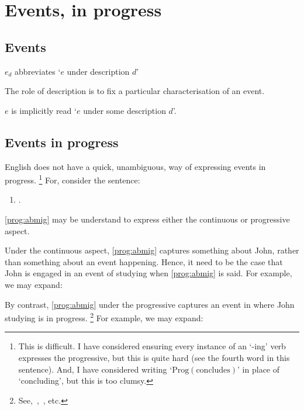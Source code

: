 \chapter{Events, in progress}
\label{cha:events-progress}


\section{Events}
\label{sec:events}


\begin{note}
  \(e_{d}\) abbreviates `\(e\) under description \(d\)'

  The role of description is to fix a particular characterisation of an event.

  \(e\) is implicitly read `\(e\) under some description \(d\)'.
\end{note}



\section{Events in progress}
\label{sec:events-progress}

\begin{note}
    \noindent%
  English does not have a quick, unambiguous, way of expressing events in progress.%
  \footnote{
    This is difficult.
    I have considered ensuring every instance of an `-ing' verb expresses the progressive, but this is quite hard (see the fourth word in this sentence).
    And, I have considered writing `\(\text{Prog}(\text{concludes})\)' in place of `concluding', but this is too clumsy.
  }
  For, consider the sentence:
  \begin{enumerate}[label=\arabic*., ref=(\arabic*)]
  \item
    \label{prog:abmig}
    .
  \end{enumerate}
  \ref{prog:abmig} may be understand to express either the continuous or progressive aspect.

  Under the continuous aspect, \ref{prog:abmig} captures something about John, rather than something about an event happening.
  Hence, it need to be the case that John is engaged in an event of studying when \ref{prog:abmig} is said.
  For example, we may expand:

  By contrast, \ref{prog:abmig} under the progressive captures an event in where John studying is in progress.%
  \footnote{
    See,~\textcite{Richards:1981wo},~\textcite{Portner:2011vi}, etc.
  }
  For example, we may expand:
\end{note}

